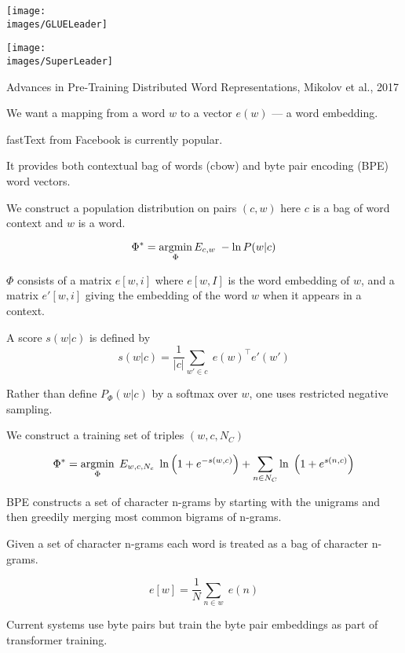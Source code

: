{

\centerline{\texttt{[image: \\images/GLUELeader]}}


\centerline{\texttt{[image: \\images/SuperLeader]}}



Advances in Pre-Training Distributed Word Representations, Mikolov et al., 2017

\vfill
We want a mapping from a word $w$ to a vector $e(w)$ --- a word embedding.

\vfill
{\color{red} fastText} from Facebook is currently popular.

\vfill
It provides both contextual bag of words (cbow) and byte pair encoding (BPE) word vectors.


We construct a population distribution on pairs $(c,w)$ here $c$ is a bag of word context and $w$ is a word.

\vfill
$$\Phi^* = \operatorname*{argmin}_\Phi E_{c,w}\;-\ln P(w|c)$$

\vfill
$\Phi$ consists of a matrix $e[w,i]$ where $e[w,I]$ is the word embedding of $w$, and a matrix $e'[w,i]$ giving the embedding of the word
$w$ when it appears in a context.

\vfill
A score $s(w|c)$ is defined by
$$s(w|c) = \frac{1}{|c|} \sum_{w' \in c}\;e(w)^\top e'(w')$$


\vfill
Rather than define $P_\Phi(w|c)$ by a softmax over $w$, one uses restricted negative sampling.

\vfill
We construct a training set of triples $(w,c,N_C)$

\vfill
$$\Phi^* = \operatorname*{argmin}_\Phi\;E_{w,c,N_c}\;\ln\left(1 + e^{-s(w,c)}\right) + \sum_{n \in N_C} \ln\;\left(1 + e^{s(n,c)}\right)$$


BPE constructs a set of character n-grams by starting with the unigrams and then greedily merging most common bigrams of n-grams.

\vfill
Given a set of character n-grams each word is treated as a bag of character n-grams.

\vfill
$$e[w] = \frac{1}{N} \sum_{n \in w}\; e(n)$$

\vfill
Current systems use byte pairs but train the byte pair embeddings as part of transformer training.

}
